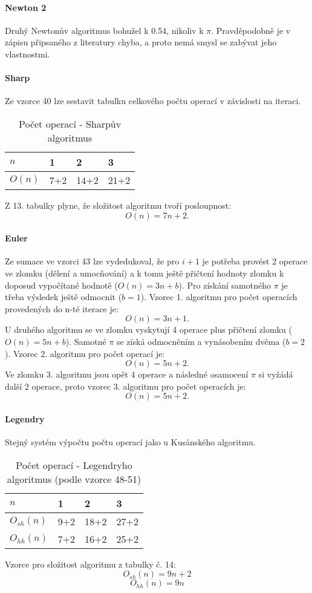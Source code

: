 \documentclass[soc]{gzwroc} %
\begin{document}
\paragraph{Newton 2}
Druhý Newtonův algoritmus bohužel k 0.54, nikoliv k $\pi$. Pravděpodobně je v zápisu připsaného z literatury chyba, a proto nemá smysl se zabývat jeho vlastnostmi.
\paragraph{Sharp}
Ze vzorce 40 lze sestavit tabulku celkového počtu operací v závislosti na iteraci.
\begin{table}[h!]
\caption{Počet operací - Sharpův algoritmus}
\begin{tabular}{|l||l|l|l|}
\hline
$n$ & 1&2&3 \\ \hline
$O(n)$&7+2&14+2&21+2 \\ \hline
\end{tabular}
\end{table}
Z 13. tabulky plyne, že složitost algoritmu tvoří posloupnost:
$$
O(n)=7n+2.
$$
\paragraph{Euler}
Ze sumace ve vzorci 43 lze vydedukoval, že pro $i+1$ je potřeba provést 2 operace ve zlomku (dělení a umocňování) a k tomu ještě přičtení hodnoty zlomku k doposud vypočítané hodnotě ($O(n)=3n+b$). Pro získání samotného $\pi$ je třeba výsledek ještě odmocnit ($b=1$). Vzorec 1. algoritmu pro počet operacích provedených do n-té iterace je:
$$
O(n)=3n+1.
$$
U druhého algoritmu se ve zlomku vyskytují 4 operace plus přičtení zlomku ($O(n)=5n+b$). Samotné $\pi$ se získá odmocněním a vynásobením dvěma ($b=2$). Vzorec 2. algoritmu pro počet operací je:
$$
O(n)=5n+2.
$$
Ve zlomku 3. algoritmu jsou opět 4 operace a následné osamocení $\pi$ si vyžádá další 2 operace, proto vzorec 3. algoritmu pro počet operacích je:
$$
O(n)=5n+2.
$$
\paragraph{Legendry}
Stejný systém výpočtu počtu operací jako u Kusánského algoritmu.
\begin{table}[h!]
\caption{Počet operací - Legendryho algoritmus (podle vzorce 48-51)}
\begin{tabular}{|l||l|l|l|}
\hline
$n$ & 1&2&3 \\ \hline
$O_{sh}(n)$&9+2&18+2&27+2 \\ \hline
$O_{hh}(n)$&7+2&16+2&25+2 \\ \hline
\end{tabular}
\end{table}
Vzorce pro složitost algoritmu z tabulky č. 14:
$$
O_{sh}(n)=9n+2
$$
$$
O_{hh}(n)=9n
$$
\end{document}
